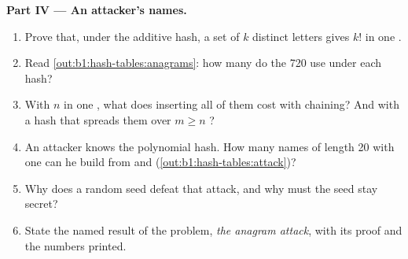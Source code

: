 \begin{problem}
\medskip\noindent\textbf{Part IV --- An attacker's names.}
\begin{enumerate}[resume]
\item Prove that, under the additive hash, a set of $k$ distinct letters gives $k!$  in one .
\item Read \cref{out:b1:hash-tables:anagrams}: how many  do the 720  use under each hash?
\item With $n$  in one , what does inserting all of them cost with chaining? And with a hash that spreads them
over $m \geq n$ ?
\item An attacker knows the polynomial hash. How many names of length 20 with one  can he build from 
and  (\cref{out:b1:hash-tables:attack})?
\item Why does a random seed defeat that attack, and why must the seed stay secret?
\item State the named result of the problem, \emph{the anagram attack}, with its proof and the numbers printed.
\end{enumerate}
\end{problem}
